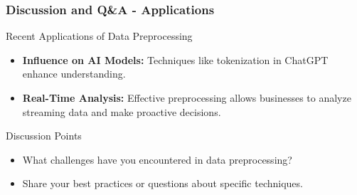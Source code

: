\documentclass[aspectratio=169]{beamer}
\begin{document}
\begin{frame}[fragile]
    \frametitle{Discussion and Q\&A - Applications}
    \begin{block}{Recent Applications of Data Preprocessing}
        \begin{itemize}
            \item \textbf{Influence on AI Models:} Techniques like tokenization in ChatGPT enhance understanding.
            \item \textbf{Real-Time Analysis:} Effective preprocessing allows businesses to analyze streaming data and make proactive decisions.
        \end{itemize}
    \end{block}
    \begin{block}{Discussion Points}
        \begin{itemize}
            \item What challenges have you encountered in data preprocessing?
            \item Share your best practices or questions about specific techniques.
        \end{itemize}
    \end{block}
\end{frame}
\end{document}
